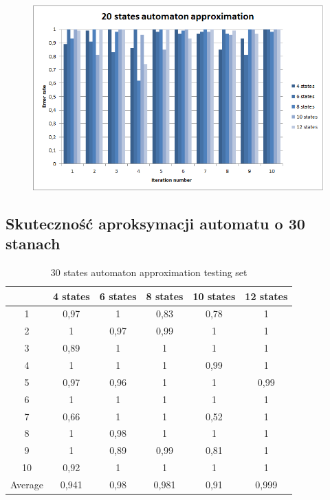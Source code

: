 \documentclass[runningheads,a4paper]{llncs}
\begin{document}
\begin{figure}
\centering
\includegraphics[scale=1]{7.png}
\end{figure}

\FloatBarrier
\subsection{Skuteczność aproksymacji automatu o 30 stanach}

\begin{table}[]
\centering
\caption{30 states automaton approximation testing set}
\label{my-label}
\begin{tabular}{@{}cccccc@{}}
\toprule
        & 4 states & 6 states & 8 states & 10 states & 12 states    \\ \midrule
1       & 0,97     & 1        & 0,83     & 0,78      & 1 \\
2       & 1        & 0,97     & 0,99     & 1         & 1 \\
3       & 0,89     & 1        & 1        & 1         & 1 \\
4       & 1        & 1        & 1        & 0,99      & 1   \\
5       & 0,97     & 0,96     & 1        & 1         & 0,99   \\
6       & 1        & 1        & 1        & 1         & 1    \\
7       & 0,66     & 1        & 1        & 0,52      & 1    \\
8       & 1        & 0,98     & 1        & 1         & 1     \\
9       & 1        & 0,89     & 0,99     & 0,81      & 1 \\
10      & 0,92     & 1        & 1        & 1         & 1  \\
Average & 0,941    & 0,98     & 0,981    & 0,91      & 0,999  \\ \bottomrule
\end{tabular}
\end{table}
\end{document}
